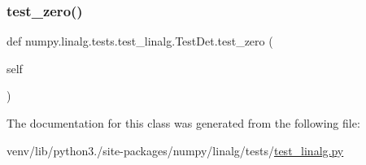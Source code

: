 \mbox{\label{classnumpy_1_1linalg_1_1tests_1_1test__linalg_1_1TestDet_a0c7a3bc8e086fbae236d5da8c0dabc51}} 
\subsubsection{\texorpdfstring{test\+\_\+zero()}{test\_zero()}}
{\footnotesize\ttfamily def numpy.\+linalg.\+tests.\+test\+\_\+linalg.\+Test\+Det.\+test\+\_\+zero (\begin{DoxyParamCaption}\item[{}]{self }\end{DoxyParamCaption})}



The documentation for this class was generated from the following file\+:\begin{DoxyCompactItemize}
\item 
venv/lib/python3./site-\/packages/numpy/linalg/tests/\hyperlink{test__linalg_8py}{test\+\_\+linalg.\+py}\end{DoxyCompactItemize}
